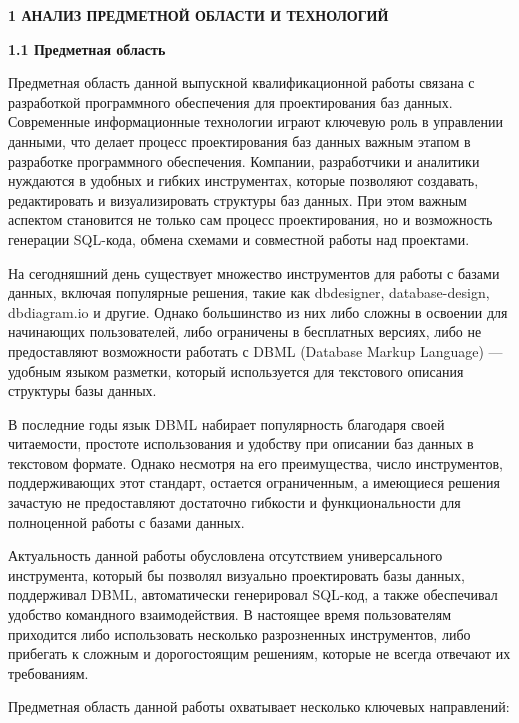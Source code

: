 \newpage
\begin{center}
  \textbf{\large 1 АНАЛИЗ ПРЕДМЕТНОЙ ОБЛАСТИ И ТЕХНОЛОГИЙ}
\end{center}


\textbf{\large 1.1 Предметная область}

Предметная область данной выпускной квалификационной работы связана с разработкой программного обеспечения для проектирования баз данных. Современные информационные технологии играют ключевую роль в управлении данными, что делает процесс проектирования баз данных важным этапом в разработке программного обеспечения. Компании, разработчики и аналитики нуждаются в удобных и гибких инструментах, которые позволяют создавать, редактировать и визуализировать структуры баз данных. При этом важным аспектом становится не только сам процесс проектирования, но и возможность генерации SQL-кода, обмена схемами и совместной работы над проектами.
	
На сегодняшний день существует множество инструментов для работы с базами данных, включая популярные решения, такие как dbdesigner, database-design, dbdiagram.io и другие. Однако большинство из них либо сложны в освоении для начинающих пользователей, либо ограничены в бесплатных версиях, либо не предоставляют возможности работать с DBML (Database Markup Language) — удобным языком разметки, который используется для текстового описания структуры базы данных.

В последние годы язык DBML набирает популярность благодаря своей читаемости, простоте использования и удобству при описании баз данных в текстовом формате. Однако несмотря на его преимущества, число инструментов, поддерживающих этот стандарт, остается ограниченным, а имеющиеся решения зачастую не предоставляют достаточно гибкости и функциональности для полноценной работы с базами данных.

Актуальность данной работы обусловлена отсутствием универсального инструмента, который бы позволял визуально проектировать базы данных, поддерживал DBML, автоматически генерировал SQL-код, а также обеспечивал удобство командного взаимодействия. В настоящее время пользователям приходится либо использовать несколько разрозненных инструментов, либо прибегать к сложным и дорогостоящим решениям, которые не всегда отвечают их требованиям.

Предметная область данной работы охватывает несколько ключевых направлений:

